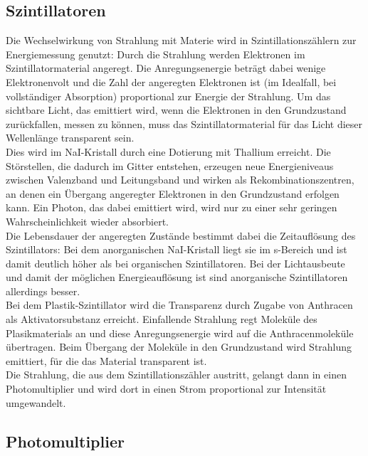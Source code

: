 \subsection{Szintillatoren}
Die Wechselwirkung von Strahlung mit Materie wird in Szintillationszählern zur Energiemessung genutzt:
Durch die Strahlung werden Elektronen im Szintillatormaterial angeregt.
Die Anregungsenergie beträgt dabei wenige Elektronenvolt und die Zahl der angeregten Elektronen
ist (im Idealfall, bei vollständiger Absorption) proportional zur Energie der Strahlung.
Um das sichtbare Licht, das emittiert wird, wenn die Elektronen in den Grundzustand zurückfallen,
messen zu können, muss das Szintillatormaterial für das Licht dieser Wellenlänge transparent sein.\\
Dies wird im NaI-Kristall durch eine Dotierung mit Thallium erreicht.
Die Störstellen, die dadurch im Gitter entstehen,
erzeugen neue Energieniveaus zwischen Valenzband und Leitungsband und wirken als
Rekombinationszentren, an denen ein Übergang angeregter Elektronen in den Grundzustand erfolgen kann.
Ein Photon, das dabei emittiert wird, wird nur zu einer sehr geringen Wahrscheinlichkeit
wieder absorbiert.\\
Die Lebensdauer der angeregten Zustände bestimmt dabei die Zeitauflösung des Szintillators:
Bei dem anorganischen NaI-Kristall liegt sie im \textmu s-Bereich und ist damit deutlich
höher als bei organischen Szintillatoren.
Bei der Lichtausbeute und damit der möglichen Energieauflösung ist sind anorganische
Szintillatoren allerdings besser.\\
Bei dem Plastik-Szintillator wird die Transparenz durch Zugabe von Anthracen als Aktivatorsubstanz erreicht.
Einfallende Strahlung regt Moleküle des Plasikmaterials an und diese Anregungsenergie wird auf die Anthracenmoleküle
übertragen. Beim Übergang der Moleküle in den Grundzustand wird Strahlung emittiert,
für die das Material transparent ist.\\
Die Strahlung, die aus dem Szintillationszähler austritt,
gelangt dann in einen Photomultiplier und wird dort in einen Strom proportional zur Intensität umgewandelt.

\subsection{Photomultiplier}